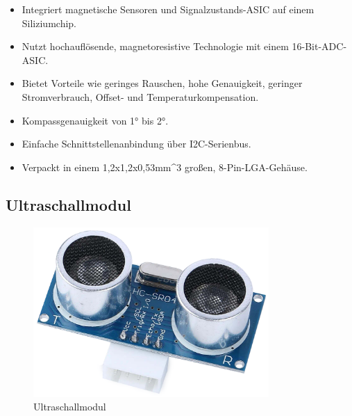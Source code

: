 \documentclass{vorlage-design-main}
\begin{document}
\begin{itemize}
  \begin{itemize}
  
  \item
    Integriert magnetische Sensoren und Signalzustands-ASIC auf einem
    Siliziumchip.
  \item
    Nutzt hochauflösende, magnetoresistive Technologie mit einem
    16-Bit-ADC-ASIC.
  \item
    Bietet Vorteile wie geringes Rauschen, hohe Genauigkeit, geringer
    Stromverbrauch, Offset- und Temperaturkompensation.
  \item
    Kompassgenauigkeit von 1° bis 2°.
  \item
    Einfache Schnittstellenanbindung über I2C-Serienbus.
  \item
    Verpackt in einem 1,2x1,2x0,53mm\^{}3 großen, 8-Pin-LGA-Gehäuse.
  \end{itemize}
\end{itemize}

\hypertarget{ultraschallmodul}{%
\subsection{Ultraschallmodul}\label{ultraschallmodul}}

\begin{figure}
\centering
\includegraphics[width=0.8\textwidth]{images/ultrasonic_pic.pdf}
\floatnotes{}
\caption{Ultraschallmodul}
\end{figure}
\end{document}
